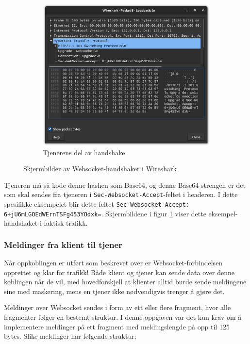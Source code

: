 \documentclass{article}
\newcommand{\code}[1]{\colorbox{light-gray}{\texttt{#1}}}
\begin{document}
\begin{figure}[h]
\begin{subfigure}{.48\linewidth}
        \includegraphics*[width=\linewidth]{illustrasjoner/WS_handshake_tjener.png}
        \caption{Tjenerens del av handshake}
    \end{subfigure}
    \caption{Skjermbilder av Websocket-handshaket i Wireshark}
    \label{fig:ws_handshake}
\end{figure}

Tjeneren må så kode denne hashen som Base64, og denne Base64-strengen er det som skal sendes fra tjeneren i \code{Sec-Websocket-Accept}-feltet i headeren. I dette spesifikke eksempelet blir dette feltet \code{Sec-Websocket-Accept: 6+jU6mLGOEdWErnTSFg453YOdxk=}. Skjermbildene i figur \ref{fig:ws_handshake} viser dette eksempel-handshaket i faktisk trafikk.

\subsubsection*{Meldinger fra klient til tjener}

Når oppkoblingen er utført som beskrevet over er Websocket-forbindelsen opprettet og klar for trafikk! Både klient og tjener kan sende data over denne koblingen når de vil, med hovedforskjell at klienter alltid burde sende meldingene sine med maskering, mens en tjener ikke nødvendigvis trenger å gjøre det.

Meldinger over Websocket sendes i form av ett eller flere fragment, hvor alle fragmenter følger en bestemt struktur. I denne oppgaven var det kun krav om å implementere meldinger på ett fragment med meldingslengde på opp til 125 bytes. Slike meldinger har følgende struktur:
\end{document}
